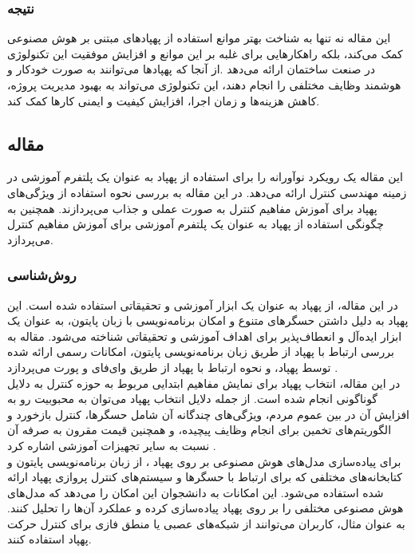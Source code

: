 \subsubsection{نتیجه}
این مقاله نه تنها به شناخت بهتر موانع استفاده از پهپادهای مبتنی بر هوش مصنوعی کمک می‌کند، بلکه راهکارهایی برای غلبه بر این موانع و افزایش موفقیت این تکنولوژی در صنعت ساختمان ارائه می‌دهد .از آنجا که
پهپادها می‌توانند به صورت خودکار و هوشمند وظایف مختلفی را انجام دهند، این تکنولوژی می‌تواند به بهبود مدیریت پروژه، کاهش هزینه‌ها و زمان اجرا، افزایش کیفیت و ایمنی کارها کمک کند.
\cite{waqar2023modeling}


\subsection{مقاله }
این مقاله یک رویکرد نوآورانه را برای استفاده از پهپاد  به عنوان یک پلتفرم آموزشی در زمینه مهندسی کنترل ارائه می‌دهد. در این مقاله به بررسی نحوه استفاده از ویژگی‌های پهپاد برای 
آموزش مفاهیم کنترل به صورت عملی و جذاب می‌پردازند. همچنین به چگونگی استفاده از پهپاد  به عنوان یک پلتفرم آموزشی برای آموزش مفاهیم کنترل می‌پردازد.

\subsubsection{روش‌شناسی}
در این مقاله، از پهپاد  به عنوان یک ابزار آموزشی و تحقیقاتی استفاده شده است. این پهپاد به دلیل داشتن حسگرهای متنوع و امکان برنامه‌نویسی با زبان پایتون، به عنوان یک 
ابزار ایده‌آل و انعطاف‌پذیر برای اهداف آموزشی و تحقیقاتی شناخته می‌شود. مقاله به بررسی ارتباط با پهپاد  از طریق زبان برنامه‌نویسی پایتون، امکانات 
 رسمی ارائه شده توسط پهپاد، و نحوه ارتباط با پهپاد از طریق وای‌فای و پورت  می‌پردازد .
\\
در این مقاله، انتخاب پهپاد  برای نمایش مفاهیم ابتدایی مربوط به حوزه کنترل به دلایل گوناگونی انجام شده است. از جمله دلایل انتخاب پهپاد می‌توان به محبوبیت رو به افزایش آن در بین عموم مردم،
ویژگی‌های چندگانه آن شامل حسگرها، کنترل بازخورد و الگوریتم‌های تخمین برای انجام وظایف پیچیده، و همچنین قیمت مقرون به صرفه آن نسبت به سایر تجهیزات آموزشی اشاره کرد .
\\
برای پیاده‌سازی مدل‌های هوش مصنوعی بر روی پهپاد ، از زبان برنامه‌نویسی پایتون و کتابخانه‌های مختلفی که برای ارتباط با حسگرها و سیستم‌های کنترل پروازی پهپاد ارائه شده استفاده می‌شود. این امکانات به دانشجوان این 
امکان را می‌دهد که مدل‌های هوش مصنوعی مختلفی را بر روی پهپاد پیاده‌سازی کرده و عملکرد آن‌ها را تحلیل کنند. به عنوان مثال، کاربران می‌توانند از شبکه‌های عصبی یا منطق فازی برای کنترل حرکت پهپاد استفاده کنند.

